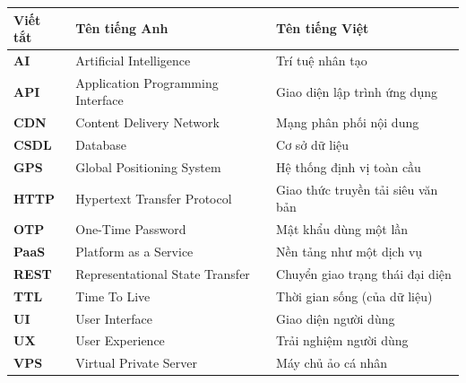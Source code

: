 \documentclass[../DoAn.tex]{subfiles}
\begin{document}
\begin{longtable}{l p{6cm} p{7cm}}
	\hline
   \textbf{Viết tắt}  & \textbf{Tên tiếng Anh}	& \textbf{Tên tiếng Việt} \\ \hline 
	\textbf{AI} & Artificial Intelligence & Trí tuệ nhân tạo\\
	\textbf{API} & Application Programming Interface & Giao diện lập trình ứng dụng\\
	\textbf{CDN} & Content Delivery Network & Mạng phân phối nội dung\\
	\textbf{CSDL} & Database & Cơ sở dữ liệu\\
	\textbf{GPS} & Global Positioning System & Hệ thống định vị toàn cầu\\
	\textbf{HTTP} & Hypertext Transfer Protocol & Giao thức truyền tải siêu văn bản\\
	\textbf{OTP} & One-Time Password & Mật khẩu dùng một lần\\
	\textbf{PaaS} & Platform as a Service & Nền tảng như một dịch vụ\\
	\textbf{REST} & Representational State Transfer & Chuyển giao trạng thái đại diện\\
	\textbf{TTL} & Time To Live & Thời gian sống (của dữ liệu)\\
	\textbf{UI} & User Interface & Giao diện người dùng\\
	\textbf{UX} & User Experience & Trải nghiệm người dùng\\
	\textbf{VPS} & Virtual Private Server & Máy chủ ảo cá nhân\\
    \hline
\end{longtable}
\end{document}
